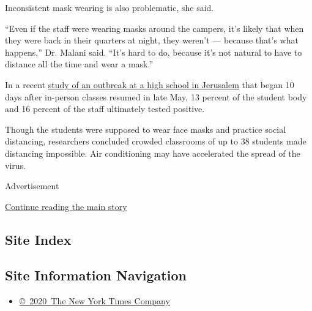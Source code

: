 Inconsistent mask wearing is also problematic, she said.

``Even if the staff were wearing masks around the campers, it's likely
that when they were back in their quarters at night, they weren't ---
because that's what happens,'' Dr. Malani said. ``It's hard to do,
because it's not natural to have to distance all the time and wear a
mask.''

In a recent
\href{https://www.eurosurveillance.org/content/10.2807/1560-7917.ES.2020.25.29.2001352\#html_fulltext}{study
of an outbreak at a high school in Jerusalem} that began 10 days after
in-person classes resumed in late May, 13 percent of the student body
and 16 percent of the staff ultimately tested positive.

Though the students were supposed to wear face masks and practice social
distancing, researchers concluded crowded classrooms of up to 38
students made distancing impossible. Air conditioning may have
accelerated the spread of the virus.

Advertisement

\protect\hyperlink{after-bottom}{Continue reading the main story}

\hypertarget{site-index}{%
\subsection{Site Index}\label{site-index}}

\hypertarget{site-information-navigation}{%
\subsection{Site Information
Navigation}\label{site-information-navigation}}

\begin{itemize}
\tightlist
\item
  \href{https://help.nytimes.com/hc/en-us/articles/115014792127-Copyright-notice}{©~2020~The
  New York Times Company}
\end{itemize}

